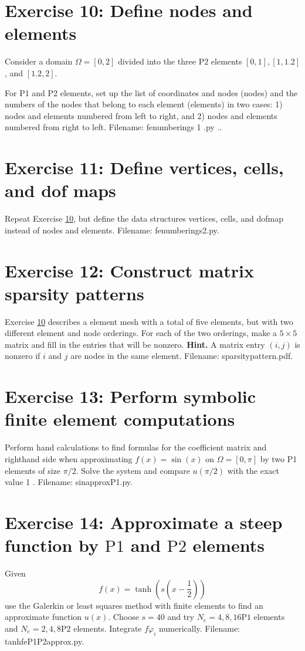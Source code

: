 \documentclass[../main.tex]{subfiles}
\begin{document}
\section*{Exercise 10: Define nodes and elements}
\label{sec:sec_10_10}
\noindent Consider a domain $\Omega=[0,2]$ divided into the three $\mathrm{P} 2$ elements $[0,1],[1,1.2]$, and $[1.2,2]$.

For P1 and P2 elements, set up the list of coordinates and nodes (nodes) and the numbers of the nodes that belong to each element (elements) in two cases: 1) nodes and elements numbered from left to right, and 2) nodes and elements numbered from right to left. Filename: fe\textunderscore numberings 1 .py ..
\bigbreak
\section*{Exercise 11: Define vertices, cells, and dof maps}
\label{sec:sec_10_11}
\noindent Repeat Exercise \hyperref[sec:sec_10_10]{10}, but define the data structures vertices, cells, and dof\textunderscore map instead of nodes and elements. Filename: fe\textunderscore numberings2.py.
\bigbreak
\section*{Exercise 12: Construct matrix sparsity patterns}
\label{sec:sec_10_12}
\noindent Exercise \hyperref[sec:sec_10_10]{10} describes a element mesh with a total of five elements, but with two different element and node orderings. For each of the two orderings, make a $5 \times 5$ matrix and fill in the entries that will be nonzero.
\bigbreak
\noindent \textbf{Hint.} A matrix entry $(i, j)$ is nonzero if $i$ and $j$ are nodes in the same element. Filename: \textunderscore sparsity\textunderscore pattern.pdf.

\section*{Exercise 13: Perform symbolic finite element computations}
\label{sec:sec_10_13}
\noindent Perform hand calculations to find formulas for the coefficient matrix and righthand side when approximating $f(x)=\sin (x)$ on $\Omega=[0, \pi]$ by two P1 elements of size $\pi / 2$. Solve the system and compare $u(\pi / 2)$ with the exact value 1 .
Filename: sin\textunderscore approx\textunderscore P1.py.
\bigbreak
\section*{Exercise 14: Approximate a steep function by $\mathrm{P} 1$ and $\mathrm{P} 2$ elements}
\label{sec:sec_10_14}
\noindent Given
$$
f(x)=\tanh \left(s\left(x-\frac{1}{2}\right)\right)
$$
use the Galerkin or least squares method with finite elements to find an approximate function $u(x)$. Choose $s=40$ and try $N_{e}=4,8,16 \mathrm{P} 1$ elements and $N_{e}=2,4,8 \mathrm{P} 2$ elements. Integrate $f \varphi_{i}$ numerically. Filename: tanh\textunderscore fe\textunderscore P1P2\textunderscore approx.py.
\bigbreak
\end{document}
